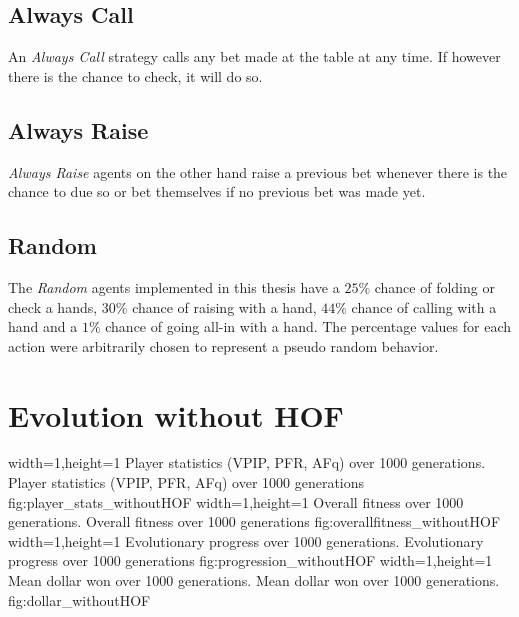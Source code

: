 \subsection{Always Call}
An \textit{Always Call} strategy calls any bet made at the table at any time. If however there is the chance to check, it will do so. 
\subsection{Always Raise}
\textit{Always Raise} agents on the other hand raise a previous bet whenever there is the chance to due so or bet themselves if no previous bet was made yet. 
\subsection{Random}
The \textit{Random} agents implemented in this thesis have a $25\%$ chance of folding or check a hands, $30\%$ chance of raising with a hand, $44\%$ chance of calling with a hand and a $1\%$ chance of going all-in with a hand. The percentage values for each action were arbitrarily chosen to represent a pseudo random behavior.

\section{Evolution without HOF}
  {width=1\textwidth,height=1\textheight}%
  {Player statistics (VPIP, PFR, AFq) over 1000 generations.}%
  {Player statistics (VPIP, PFR, AFq) over 1000 generations}%
  {fig:player_stats_withoutHOF}%
  {width=1\textwidth,height=1\textheight}%
  {Overall fitness over 1000 generations.}%
  {Overall fitness over 1000 generations}%
  {fig:overallfitness_withoutHOF}%
  {width=1\textwidth,height=1\textheight}%
  {Evolutionary progress over 1000 generations.}%
  {Evolutionary progress over 1000 generations}%
  {fig:progression_withoutHOF}%
  {width=1\textwidth,height=1\textheight}%
  {Mean dollar won over 1000 generations.}%
  {Mean dollar won over 1000 generations.}%
  {fig:dollar_withoutHOF}%
